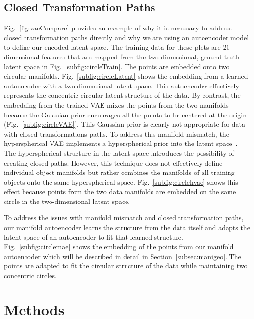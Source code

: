 \documentclass[letterpaper]{article} %
\begin{document}
\subsection{Closed Transformation Paths}

Fig.~\ref{fig:vaeCompare} provides an example of why it is necessary to address closed transformation paths directly and why we are using an autoencoder model to define our encoded latent space. The training data for these plots are 20-dimensional features that are mapped from the two-dimensional, ground truth latent space in Fig.~\ref{subfig:circleTrain}. The points are embedded onto two circular manifolds. Fig.~\ref{subfig:circleLatent} shows the embedding from a learned autoencoder with a two-dimensional latent space. This autoencoder effectively represents the concentric circular latent structure of the data. By contrast, the embedding from the trained VAE mixes the points from the two manifolds because the Gaussian prior encourages all the points to be centered at the origin (Fig.~\ref{subfig:circleVAE}). This Gaussian prior is clearly not appropriate for data with closed transformations paths. To address this manifold mismatch, the hyperspherical VAE implements a hyperspherical prior into the latent space~\cite{davidson2018hyperspherical}. The hyperspherical structure in the latent space introduces the possibility of creating closed paths. However, this technique does not effectively define individual object manifolds but rather combines the manifolds of all training objects onto the same hyperspherical space. Fig.~\ref{subfig:circlehvae} shows this effect because points from the two data manifolds are embedded on the same circle in the two-dimensional latent space.

To address the issues with manifold mismatch and closed transformation paths, our manifold autoencoder learns the structure from the data itself and adapts the latent space of an autoencoder to fit that learned structure. Fig.~\ref{subfig:circlemae} shows the embedding of the points from our manifold autoencoder which will be described in detail in Section~\ref{subsec:manigeo}. The points are adapted to fit the circular structure of the data while maintaining two concentric circles.


\section{Methods}
\end{document}

